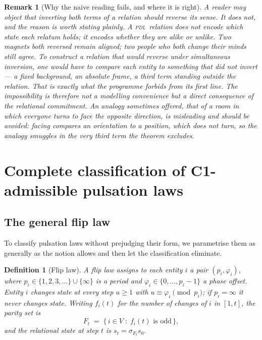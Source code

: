 \documentclass[11pt,a4paper]{article}
\newtheorem{definition}[theorem]{Definition}
\newtheorem{remark}[theorem]{Remark}
\newcommand{\PDL}{\textsc{pdl}}
\begin{document}
\begin{remark}[Why the naive reading fails, and where it is right]
\label{rem:naive}
A reader may object that inverting both terms of a relation should reverse its sense. It does not, and the reason is worth stating plainly. A \PDL\ relation does not encode which state each relatum holds; it encodes whether they are \emph{alike or unlike}. Two magnets both reversed remain aligned; two people who both change their minds still agree. To construct a relation that would reverse under simultaneous inversion, one would have to compare each entity to something that did not invert --- a fixed background, an absolute frame, a third term standing outside the relation. That is exactly what the programme forbids from its first line. The impossibility is therefore not a modelling convenience but a direct consequence of the relational commitment. An analogy sometimes offered, that of a room in which everyone turns to face the opposite direction, is misleading and should be avoided: facing compares an orientation to a \emph{position}, which does not turn, so the analogy smuggles in the very third term the theorem excludes.
\end{remark}

\section{Complete classification of C1-admissible pulsation laws}
\label{sec:classification}

\subsection{The general flip law}

To classify pulsation laws without prejudging their form, we parametrise them as generally as the notion allows and then let the classification eliminate.

\begin{definition}[Flip law]
\label{def:law}
A \emph{flip law} assigns to each entity $i$ a pair $(p_i,\varphi_i)$, where $p_i\in\{1,2,3,\dots\}\cup\{\infty\}$ is a period and $\varphi_i\in\{0,\dots,p_i-1\}$ a phase offset. Entity $i$ changes state at every step $u\ge1$ with $u\equiv\varphi_i \pmod{p_i}$; if $p_i=\infty$ it never changes state. Writing $f_i(t)$ for the number of changes of $i$ in $[1,t]$, the \emph{parity set} is
\[
F_t \;=\; \{\, i \in V \;:\; f_i(t) \text{ is odd} \,\},
\]
and the relational state at step $t$ is $s_t=\sigma_{F_t}s_0$.
\end{definition}
\end{document}

